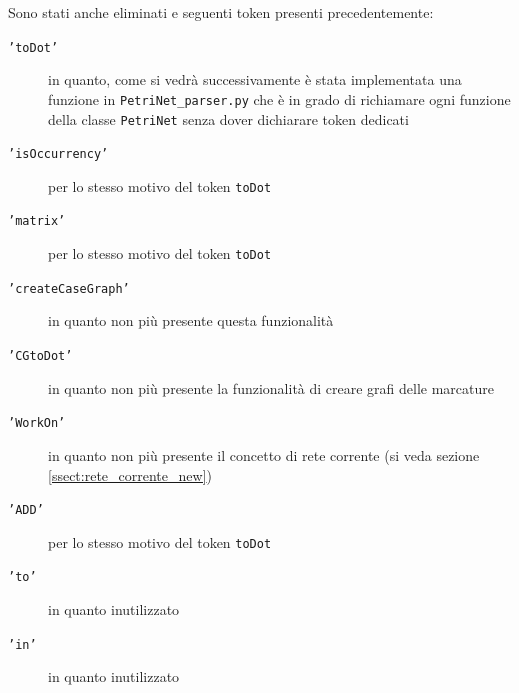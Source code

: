 \documentclass[italian,12pt]{book}
\begin{document}
Sono stati anche eliminati e seguenti token presenti precedentemente:

\begin{description}

\item[{\tt 'toDot'}] in quanto, come si vedrà successivamente è stata implementata una funzione in  {\tt PetriNet\_parser.py} che è in grado di richiamare ogni funzione della classe {\tt PetriNet} senza dover dichiarare token dedicati

\item[{\tt 'isOccurrency'}] per lo stesso motivo del token {\tt toDot}

\item[{\tt 'matrix'}] per lo stesso motivo del token {\tt toDot}

\item[{\tt 'createCaseGraph'}] in quanto non più presente questa funzionalità

\item[{\tt 'CGtoDot'}] in quanto non più presente la funzionalità di creare grafi delle marcature

\item[{\tt 'WorkOn'}] in quanto non più presente il concetto di rete corrente (si veda sezione \ref{ssect:rete_corrente_new})

\item[{\tt 'ADD'}] per lo stesso motivo del token {\tt toDot}

\item[{\tt 'to'}] in quanto inutilizzato

\item[{\tt 'in'}] in quanto inutilizzato

\end{description}
\end{document}
